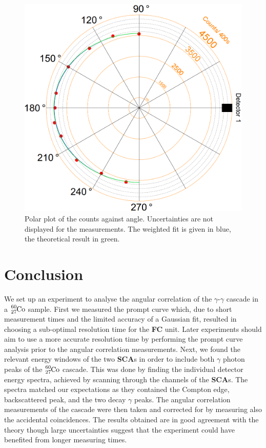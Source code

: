 \documentclass[twocolumn]{article}
\begin{document}
\begin{figure}[h!]
	\centering
	\includegraphics[width=\linewidth]{polar2.png}
	\caption{Polar plot of the counts against angle. Uncertainties are not displayed for the measurements. The weighted fit is given in blue, the theoretical result in green.}
	\label{fig:polar}
\end{figure}

\section{Conclusion}
We set up an experiment to analyse the angular correlation of the $\gamma$-$\gamma$ cascade in a $\ce{_27^{60}Co}$ sample. First we measured the prompt curve which, due to short measurement times and the limited accuracy of a Gaussian fit, resulted in choosing a sub-optimal resolution time for the \textbf{FC} unit. Later experiments should aim to use a more accurate resolution time by performing the prompt curve analysis prior to the angular correlation measurements. Next, we found the relevant energy windows of the two \textbf{SCA}s in order to include both $\gamma$ photon peaks of the $\ce{_27^{60}Co}$ cascade. This was done by finding the individual detector energy spectra, achieved by scanning through the channels of the \textbf{SCA}s. The spectra matched our expectations as they contained the Compton edge, backscattered peak, and the two decay $\gamma$ peaks. The angular correlation measurements of the cascade were then taken and corrected for by measuring also the accidental coincidences. The results obtained are in good agreement with the theory though large uncertainties suggest that the experiment could have benefited from longer measuring times.
\end{document}
